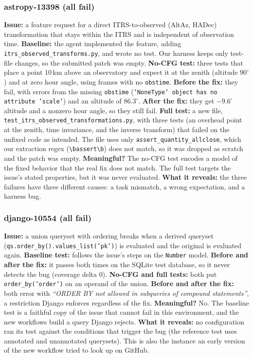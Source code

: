 \documentclass[conference]{IEEEtran}
\begin{document}
\subsubsection{astropy-13398 (all fail)}
\textbf{Issue:} a feature request for a direct ITRS-to-observed (AltAz, HADec) transformation that stays within the ITRS and is independent of observation time. \textbf{Baseline:} the agent implemented the feature, adding \texttt{itrs\_observed\_transforms.py}, and wrote no test. Our harness keeps only test-file changes, so the submitted patch was empty. \textbf{No-CFG test:} three tests that place a point 10\,km above an observatory and expect it at the zenith (altitude $90^\circ$) and at zero hour angle, using frames with no \texttt{obstime}. \textbf{Before the fix:} they fail, with errors from the missing \texttt{obstime} (\texttt{'NoneType' object has no attribute 'scale'}) and an altitude of $86.3^\circ$. \textbf{After the fix:} they get $-9.6^\circ$ altitude and a nonzero hour angle, so they still fail. \textbf{Full test:} a new file, \texttt{test\_itrs\_observed\_transformations.py}, with three tests (an overhead point at the zenith, time invariance, and the inverse transform) that failed on the unfixed code as intended. The file uses only \texttt{assert\_quantity\_allclose}, which our extraction regex (\texttt{\textbackslash bassert\textbackslash b}) does not match, so it was dropped as scratch and the patch was empty. \textbf{Meaningful?} The no-CFG test encodes a model of the fixed behavior that the real fix does not match. The full test targets the issue's stated properties, but it was never evaluated. \textbf{What it reveals:} the three failures have three different causes: a task mismatch, a wrong expectation, and a harness bug.

\subsubsection{django-10554 (all fail)}
\textbf{Issue:} a union queryset with ordering breaks when a derived queryset (\texttt{qs.order\_by().values\_list('pk')}) is evaluated and the original is evaluated again. \textbf{Baseline test:} follows the issue's steps on the \texttt{Number} model. \textbf{Before and after the fix:} it passes both times on the SQLite test database, so it never detects the bug (coverage delta 0). \textbf{No-CFG and full tests:} both put \texttt{order\_by('order')} on an operand of the union. \textbf{Before and after the fix:} both error with \textit{``ORDER BY not allowed in subqueries of compound statements''}, a restriction Django enforces regardless of the fix. \textbf{Meaningful?} No. The baseline test is a faithful copy of the issue that cannot fail in this environment, and the new workflows build a query Django rejects. \textbf{What it reveals:} no configuration ran its test against the conditions that trigger the bug (the reference test uses annotated and unannotated querysets). This is also the instance an early version of the new workflow tried to look up on GitHub.
\end{document}
